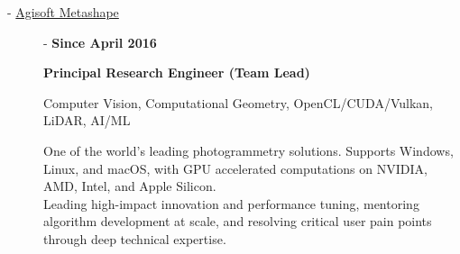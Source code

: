 \documentclass[11pt,oneside]{article}
\newcommand{\hhref}[2]{\href{#1}{\color{blue}#2}}
\begin{document}
\begin{description}

  \item[ - \hhref{https://en.wikipedia.org/wiki/PhotoScan}{Agisoft Metashape}] - \textbf{Since April 2016}

    \textbf{Principal Research Engineer (Team Lead)}

    Computer Vision, Computational Geometry, OpenCL/CUDA/Vulkan, LiDAR, AI/ML

    One of the world's leading photogrammetry solutions. Supports Windows, Linux, and macOS, with GPU accelerated computations on NVIDIA, AMD, Intel, and Apple Silicon.\\
    Leading high-impact innovation and performance tuning, mentoring algorithm development at scale, and resolving critical user pain points through deep technical expertise.

    \begin{itemize}


\end{itemize}
\end{description}
\end{document}
